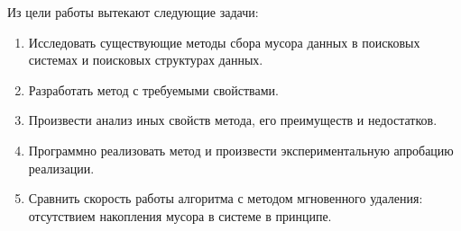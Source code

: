 Из цели работы вытекают следующие задачи:
\begin{enumerate}
    \item Исследовать существующие методы сбора мусора данных в поисковых системах
    и поисковых структурах данных.
    \item Разработать метод с требуемыми свойствами.
    \item Произвести анализ иных свойств метода, его преимуществ и недостатков.
    \item Программно реализовать метод и произвести экспериментальную апробацию реализации. 
    \item Сравнить скорость работы алгоритма с методом мгновенного удаления: отсутствием накопления
    мусора в системе в принципе.
\end{enumerate}